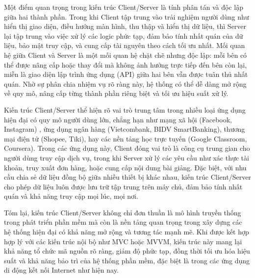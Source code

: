     
      Một điểm quan trọng trong kiến trúc Client/Server là tính phân tán và độc lập giữa hai thành phần. Trong khi Client tập trung vào trải nghiệm người dùng như hiển thị giao diện, điều hướng màn hình, thu thập và hiển thị dữ liệu, thì Server lại tập trung vào việc xử lý các logic phức tạp, đảm bảo tính nhất quán của dữ liệu, bảo mật truy cập, và cung cấp tài nguyên theo cách tối ưu nhất. Mối quan hệ giữa Client và Server là một mối quan hệ chặt chẽ nhưng độc lập: mỗi bên có thể được nâng cấp hoặc thay đổi mà không ảnh hưởng trực tiếp đến bên còn lại, miễn là giao diện lập trình ứng dụng (API) giữa hai bên vẫn được tuân thủ nhất quán. Nhờ sự phân chia nhiệm vụ rõ ràng này, hệ thống có thể dễ dàng mở rộng về quy mô, nâng cấp từng thành phần riêng biệt và tối ưu hiệu suất xử lý.
    \vspace{0.5em}

    
      Kiến trúc Client/Server thể hiện rõ vai trò trung tâm trong nhiều loại ứng dụng hiện đại có quy mô người dùng lớn, chẳng hạn như mạng xã hội (Facebook, Instagram) \cite{social-apps}, ứng dụng ngân hàng (Vietcombank, BIDV SmartBanking), thương mại điện tử (Shopee, Tiki), hay các nền tảng học trực tuyến (Google Classroom, Coursera). Trong các ứng dụng này, Client đóng vai trò là công cụ trung gian cho người dùng truy cập dịch vụ, trong khi Server xử lý các yêu cầu như xác thực tài khoản, truy xuất đơn hàng, hoặc cung cấp nội dung bài giảng. Đặc biệt, với nhu cầu chia sẻ dữ liệu đồng bộ giữa nhiều thiết bị khác nhau, kiến trúc Client/Server cho phép dữ liệu luôn được lưu trữ tập trung trên máy chủ, đảm bảo tính nhất quán và khả năng truy cập mọi lúc, mọi nơi.
    \vspace{0.5em}

    
      Tóm lại, kiến trúc Client/Server không chỉ đơn thuần là mô hình truyền thống trong phát triển phần mềm mà còn là nền tảng quan trọng trong xây dựng các hệ thống hiện đại có khả năng mở rộng và tương tác mạnh mẽ. Khi được kết hợp hợp lý với các kiến trúc nội bộ như MVC hoặc MVVM, kiến trúc này mang lại khả năng tổ chức mã nguồn rõ ràng, giảm độ phức tạp, đồng thời tối ưu hóa hiệu suất và khả năng bảo trì của hệ thống phần mềm, đặc biệt là trong các ứng dụng di động kết nối Internet như hiện nay.
